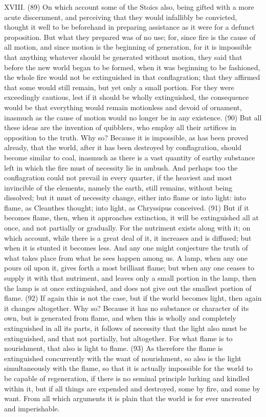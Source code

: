 XVIII. (89) On which account some of the Stoics also, being gifted with a more acute discernment,
and perceiving that they would infallibly be convicted, thought it well to be beforehand in preparing
assistance as it were for a defunct proposition. But what they prepared was of no use; for, since
fire is the cause of all motion, and since motion is the beginning of generation, for it is impossible
that anything whatever should be generated without motion, they said that before the new world
began to be formed, when it was beginning to be fashioned, the whole fire would not be
extinguished in that conflagration; that they affirmed that some would still remain, but yet only a
small portion. For they were exceedingly cautious, lest if it should be wholly extinguished, the
consequence would be that everything would remain motionless and devoid of ornament, inasmuch
as the cause of motion would no longer be in any existence. (90) But all these ideas are the
invention of quibblers, who employ all their artifices in opposition to the truth. Why so? Because it
is impossible, as has been proved already, that the world, after it has been destroyed by
conflagration, should become similar to coal, inasmuch as there is a vast quantity of earthy
substance left in which the fire must of necessity lie in ambush. And perhaps too the conflagration
could not prevail in every quarter, if the heaviest and most invincible of the elements, namely the
earth, still remains, without being dissolved; but it must of necessity change, either into flame or
into light: into flame, as Cleanthes thought; into light, as Chryssipus conceived. (91) But if it
becomes flame, then, when it approaches extinction, it will be extinguished all at once, and not
partially or gradually. For the nutriment exists along with it; on which account, while there is a great
deal of it, it increases and is diffused; but when it is stunted it becomes less. And any one might
conjecture the truth of what takes place from what he sees happen among us. A lamp, when any
one pours oil upon it, gives forth a most brilliant flame; but when any one ceases to supply it with
that nutriment, and leaves only a small portion in the lamp, then the lamp is at once extinguished,
and does not give out the smallest portion of flame. (92) If again this is not the case, but if the world
becomes light, then again it changes altogether. Why so? Because it has no substance or
character of its own, but is generated from flame, and when this is wholly and completely
extinguished in all its parts, it follows of necessity that the light also must be extinguished, and that
not partially, but altogether. For what flame is to nourishment, that also is light to flame. (93) As
therefore the flame is extinguished concurrently with the want of nourishment, so also is the light
simultaneously with the flame, so that it is actually impossible for the world to be capable of
regeneration, if there is no seminal principle lurking and kindled within it, but if all things are
expended and destroyed, some by fire, and some by want. From all which arguments it is plain that
the world is for ever uncreated and imperishable.


